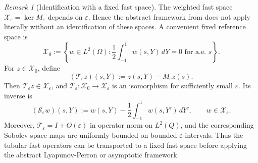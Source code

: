 \documentclass[11pt]{article}
\theoremstyle{definition}
\theoremstyle{remark}
\newtheorem{remark}[theorem]{Remark}
\numberwithin{equation}{section}
\begin{document}
\begin{remark}[Identification with a fixed fast space]
The weighted fast space \(\mathcal X_\varepsilon=\ker M_\varepsilon\) depends
on \(\varepsilon\). Hence the abstract framework from 
does not apply literally without an identification of these spaces. A
convenient fixed reference space is
\[
\mathcal X_0:=\left\{w\in L^2(\Omega):\frac12\int_{-1}^1w(s,Y)\,dY=0
\text{ for a.e. }s\right\}.
\]
For \(z\in\mathcal X_0\), define
\[
(\mathcal T_\varepsilon z)(s,Y)
:=
z(s,Y)-M_\varepsilon z(s).
\]
Then \(\mathcal T_\varepsilon z\in\mathcal X_\varepsilon\), and
\(\mathcal T_\varepsilon:\mathcal X_0\to\mathcal X_\varepsilon\) is an
isomorphism for sufficiently small \(\varepsilon\). Its inverse is
\[
(\mathcal S_\varepsilon w)(s,Y)
:=
w(s,Y)-\frac12\int_{-1}^1w(s,Y')\,dY',
\qquad
w\in\mathcal X_\varepsilon.
\]
Moreover, \(\mathcal T_\varepsilon=I+O(\varepsilon)\) in operator norm on
\(L^2(Q)\), and the corresponding Sobolev-space maps are uniformly bounded
on bounded \(\varepsilon\)-intervals. Thus the tubular fast operators can be
transported to a fixed fast space before applying the abstract
Lyapunov-Perron or asymptotic framework.
\end{remark}
\end{document}
